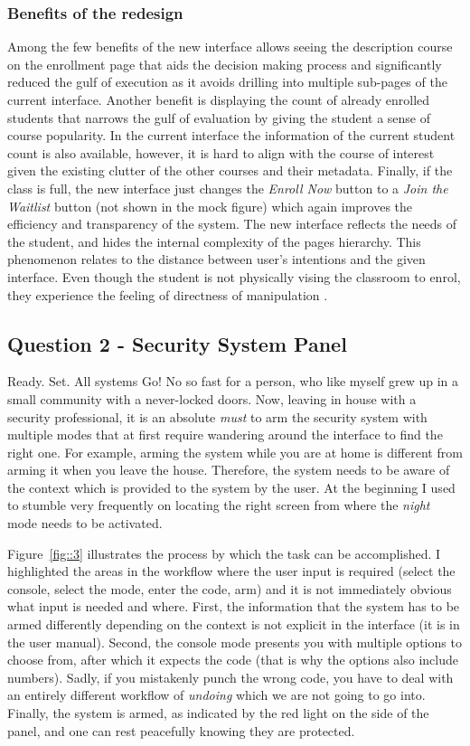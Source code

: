\documentclass[12pt,letterpaper]{article}
\begin{document}
\subsubsection*{Benefits of the redesign}
Among the few benefits of the new interface allows seeing the description course on the enrollment page that aids the decision making process and significantly reduced the gulf of execution as it avoids drilling into multiple sub-pages of the current interface. Another benefit is displaying the count of already enrolled students that narrows the gulf of evaluation by giving the student a sense of course popularity. In the current interface the information of the current student count is also available, however, it is hard to align with the course of interest given the existing clutter of the other courses and their metadata. Finally, if the class is full, the new interface just changes the \textit{Enroll Now} button to a \textit{Join the Waitlist} button (not shown in the mock figure) which again improves the efficiency and transparency of the system. The new interface reflects the needs of the student, and hides the internal complexity of the pages hierarchy. This phenomenon relates to the distance between user's intentions and the given interface. Even though the student is not physically vising the classroom to enrol, they experience the feeling of directness of manipulation \cite{hutchins1985direct}. 

\subsection*{Question 2 - Security System Panel}
Ready. Set. All systems Go! No so fast for a person, who like myself grew up in a small community with a never-locked doors. Now, leaving in house with a security professional, it is an absolute \textit{must} to arm the security system with multiple modes that at first require wandering around the interface to find the right one. For example, arming the system while you are at home is different from arming it when you leave the house. Therefore, the system needs to be aware of the context which is provided to the system by the user. At the beginning I used to stumble very frequently on locating the right screen from where the \textit{night} mode needs to be activated. 

Figure~\ref{fig::3} illustrates the process by which the task can be accomplished. I highlighted the areas in the workflow where the user input is required (select the console, select the mode, enter the code, arm) and it is not immediately obvious what input is needed and where. First, the information that the system has to be armed differently depending on the context is not explicit in the interface (it is in the user manual). Second, the console mode presents you with multiple options to choose from, after which it expects the code (that is why the options also include numbers). Sadly, if you mistakenly punch the wrong code, you have to deal with an entirely different workflow of \textit{undoing} which we are not going to go into. Finally, the system is armed, as indicated by the red light on the side of the panel, and one can rest peacefully knowing they are protected.  
\end{document}
